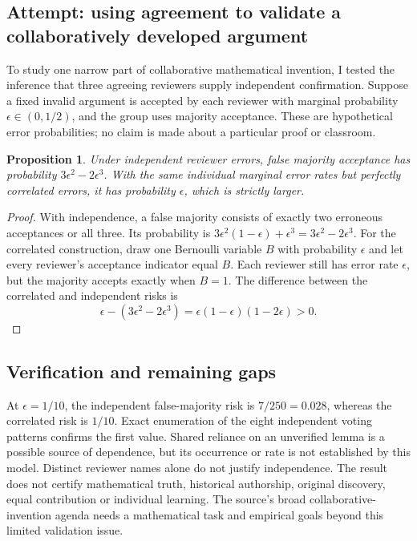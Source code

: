 \documentclass[11pt]{article}
\newtheorem{proposition}{Proposition}
\begin{document}
\subsection{Attempt: using agreement to validate a collaboratively developed argument}
To study one narrow part of collaborative mathematical invention, I tested the inference that three agreeing reviewers supply independent confirmation. Suppose a fixed invalid argument is accepted by each reviewer with marginal probability $\epsilon\in(0,1/2)$, and the group uses majority acceptance. These are hypothetical error probabilities; no claim is made about a particular proof or classroom.
\begin{proposition}
Under independent reviewer errors, false majority acceptance has probability $3\epsilon^2-2\epsilon^3$. With the same individual marginal error rates but perfectly correlated errors, it has probability $\epsilon$, which is strictly larger.
\end{proposition}
\begin{proof}
With independence, a false majority consists of exactly two erroneous acceptances or all three. Its probability is $3\epsilon^2(1-\epsilon)+\epsilon^3=3\epsilon^2-2\epsilon^3$. For the correlated construction, draw one Bernoulli variable $B$ with probability $\epsilon$ and let every reviewer's acceptance indicator equal $B$. Each reviewer still has error rate $\epsilon$, but the majority accepts exactly when $B=1$. The difference between the correlated and independent risks is
\[
\epsilon-(3\epsilon^2-2\epsilon^3)=\epsilon(1-\epsilon)(1-2\epsilon)>0.
\]
\end{proof}
\subsection{Verification and remaining gaps}
At $\epsilon=1/10$, the independent false-majority risk is $7/250=0.028$, whereas the correlated risk is $1/10$. Exact enumeration of the eight independent voting patterns confirms the first value. Shared reliance on an unverified lemma is a possible source of dependence, but its occurrence or rate is not established by this model. Distinct reviewer names alone do not justify independence. The result does not certify mathematical truth, historical authorship, original discovery, equal contribution or individual learning. The source's broad collaborative-invention agenda needs a mathematical task and empirical goals beyond this limited validation issue.
\end{document}
